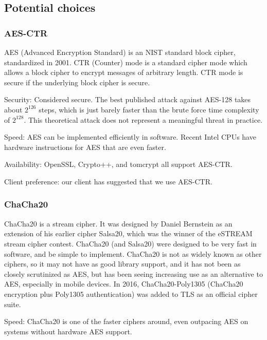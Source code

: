 \subsection{ Potential choices }
\subsubsection{ AES-CTR }

AES (Advanced Encryption Standard) is an NIST standard block cipher, standardized in 2001. CTR (Counter) mode is a standard cipher mode which allows a block cipher to encrypt messages of arbitrary length. CTR mode is secure if the underlying block cipher is secure.


Security: Considered secure. The best published attack against AES-128 takes about $2^{126}$ steps, which is just barely faster than the brute force time complexity of $2^{128}$. %
This theoretical attack does not represent a meaningful threat in practice.

Speed: AES can be implemented efficiently in software. %
Recent Intel CPUs have hardware instructions for AES that are even faster.

Availability: OpenSSL, Crypto++, and tomcrypt all support AES-CTR.

Client preference: our client has suggested that we use AES-CTR.

\subsubsection{ ChaCha20 }

ChaCha20 \cite{chacha} is a stream cipher. It was designed by Daniel Bernstein as an extension of his earlier cipher Salsa20, which was the winner of the eSTREAM stream cipher contest.
ChaCha20 (and Salsa20) were designed to be very fast in software, and be simple to implement.
ChaCha20 is not as widely known as other ciphers, so it may not have as good library support, and it has not been as closely scrutinized as AES, but has been seeing increasing use as an alternative to AES, especially in mobile devices. In 2016, ChaCha20-Poly1305 (ChaCha20 encryption plus Poly1305 authentication) was added to TLS as an official cipher suite. \cite{rfc7905}

Speed: ChaCha20 is one of the faster ciphers around, even outpacing AES on systems without hardware AES support. \cite{eBACS}

